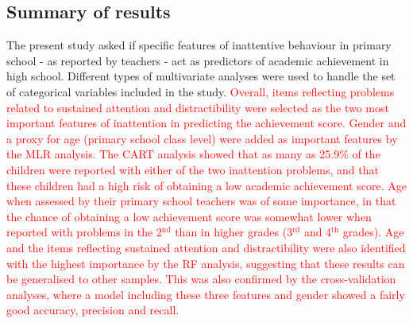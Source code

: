 \documentclass[10pt,letterpaper]{article}
\begin{document}
{{\subsection*{Summary of results}
The present study asked if specific features of inattentive behaviour in primary school - as reported by teachers - act as predictors of academic achievement in high school. Different types of multivariate analyses were used to handle the set of categorical variables included in the study.  \textcolor{red}{Overall, items reflecting problems related to sustained attention and distractibility were selected as the two most important features of inattention in predicting the achievement score. Gender and a proxy for age (primary school class level) were added as important features by the MLR analysis. The CART analysis showed that as many as 25.9\% of the children were reported with either of the two inattention problems, and that these children had a high risk of obtaining a low academic achievement score. Age  when assessed by their primary school teachers was of some importance, in that the chance of obtaining a low achievement score was somewhat lower when reported with problems in the  2$^{\text{nd}}$ than in higher grades (3$^{\text{rd}}$ and 4$^{\text{th}}$  grades). Age and the items reflecting sustained attention and distractibility were also identified with the highest importance by the RF analysis, suggesting that these results can be generalised to other samples. This was also confirmed by the cross-validation analyses, where a model including these three features and gender showed a fairly good accuracy, precision and recall.}\\

% 

}}
\end{document}
